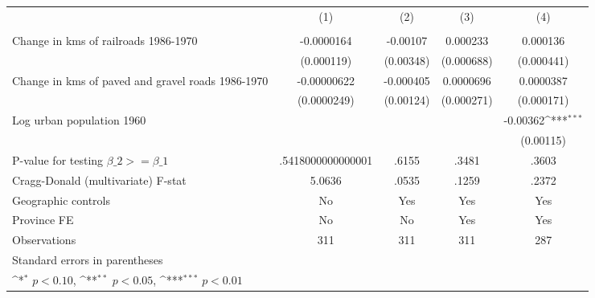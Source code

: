 {
\def\sym#1{\ifmmode^{#1}\else\(^{#1}\)\fi}
\begin{tabular}{l*{4}{c}}
\hline\hline
                &\multicolumn{1}{c}{(1)}&\multicolumn{1}{c}{(2)}&\multicolumn{1}{c}{(3)}&\multicolumn{1}{c}{(4)}\\
                &\multicolumn{1}{c}{}&\multicolumn{1}{c}{}&\multicolumn{1}{c}{}&\multicolumn{1}{c}{}\\
\hline
Change in kms of railroads 1986-1970&-0.0000164         & -0.00107         & 0.000233         & 0.000136         \\
                &(0.000119)         &(0.00348)         &(0.000688)         &(0.000441)         \\
[1em]
Change in kms of paved and gravel roads 1986-1970&-0.00000622         &-0.000405         &0.0000696         &0.0000387         \\
                &(0.0000249)         &(0.00124)         &(0.000271)         &(0.000171)         \\
[1em]
Log urban population 1960&                  &                  &                  & -0.00362\sym{***}\\
                &                  &                  &                  &(0.00115)         \\
\hline
P-value for testing $\beta\_{2} >= \beta\_{1}$&.5418000000000001         &    .6155         &    .3481         &    .3603         \\
Cragg-Donald (multivariate) F-stat&   5.0636         &    .0535         &    .1259         &    .2372         \\
Geographic controls&       No         &      Yes         &      Yes         &      Yes         \\
Province FE     &       No         &       No         &      Yes         &      Yes         \\
Observations    &      311         &      311         &      311         &      287         \\
\hline\hline
\multicolumn{5}{l}{\footnotesize Standard errors in parentheses}\\
\multicolumn{5}{l}{\footnotesize \sym{*} \(p<0.10\), \sym{**} \(p<0.05\), \sym{***} \(p<0.01\)}\\
\end{tabular}
}
